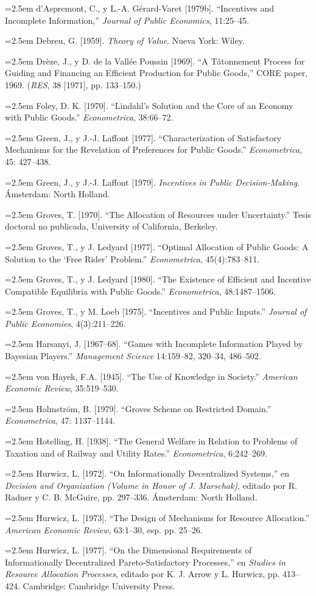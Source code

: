 \documentclass[12pt, letterpaper]{article}
\newcommand{\bibentry}[1]{\noindent\hangindent=2.5em\hangafter=1 \small #1 \par\vspace{0.75em}}
\begin{document}
\bibentry{d'Aspremont, C., y L.-A. Gérard-Varet [1979b]. ``Incentives and Incomplete Information,'' \textit{Journal of Public Economics}, 11:25--45.}
\bibentry{Debreu, G. [1959]. \textit{Theory of Value}. Nueva York: Wiley.}
\bibentry{Drèze, J., y D. de la Vallée Poussin [1969]. ``A Tâtonnement Process for Guiding and Financing an Efficient Production for Public Goods,'' CORE paper, 1969. (\textit{RES}, 38 [1971], pp. 133--150.)}
\bibentry{Foley, D. K. [1970]. ``Lindahl's Solution and the Core of an Economy with Public Goods.'' \textit{Econometrica}, 38:66--72.}
\bibentry{Green, J., y J.-J. Laffont [1977]. ``Characterization of Satisfactory Mechanisms for the Revelation of Preferences for Public Goods.'' \textit{Econometrica}, 45: 427--438.}
\bibentry{Green, J., y J.-J. Laffont [1979]. \textit{Incentives in Public Decision-Making}. Ámsterdam: North Holland.}
\bibentry{Groves, T. [1970]. ``The Allocation of Resources under Uncertainty.'' Tesis doctoral no publicada, University of California, Berkeley.}
\bibentry{Groves, T., y J. Ledyard [1977]. ``Optimal Allocation of Public Goods: A Solution to the `Free Rider' Problem.'' \textit{Econometrica}, 45(4):783--811.}
\bibentry{Groves, T., y J. Ledyard [1980]. ``The Existence of Efficient and Incentive Compatible Equilibria with Public Goods.'' \textit{Econometrica}, 48:1487--1506.}
\bibentry{Groves, T., y M. Loeb [1975]. ``Incentives and Public Inputs.'' \textit{Journal of Public Economies}, 4(3):211--226.}
\bibentry{Harsanyi, J. [1967--68]. ``Games with Incomplete Information Played by Bayesian Players.'' \textit{Management Science} 14:159--82, 320--34, 486--502.}
\bibentry{von Hayek, F.A. [1945]. ``The Use of Knowledge in Society.'' \textit{American Economic Review}, 35:519--530.}
\bibentry{Holmström, B. [1979]. ``Groves Scheme on Restricted Domain.'' \textit{Econometrica}, 47: 1137--1144.}
\bibentry{Hotelling, H. [1938]. ``The General Welfare in Relation to Problems of Taxation and of Railway and Utility Rates.'' \textit{Econometrica}, 6:242--269.}
\bibentry{Hurwicz, L. [1972]. ``On Informationally Decentralized Systems,'' en \textit{Decision and Organization (Volume in Honor of J. Marschak)}, editado por R. Radner y C. B. McGuire, pp. 297--336. Ámsterdam: North Holland.}
\bibentry{Hurwicz, L. [1973]. ``The Design of Mechanisms for Resource Allocation.'' \textit{American Economic Review}, 63:1--30, esp. pp. 25--26.}
\bibentry{Hurwicz, L. [1977]. ``On the Dimensional Requirements of Informationally Decentralized Pareto-Satisfactory Processes,'' en \textit{Studies in Resource Allocation Processes}, editado por K. J. Arrow y L. Hurwicz, pp. 413--424. Cambridge: Cambridge University Press.}
\end{document}

